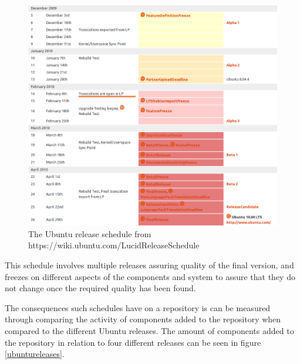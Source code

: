\begin{figure}[htp]
\begin{center}
  \includegraphics[width=\textwidth]{ubuntusimulationpics/ubunturelease}
  \caption[labelInTOC]{The Ubuntu release schedule from https://wiki.ubuntu.com/LucidReleaseSchedule}
  \label{ubuntuSchedule}
\end{center}
\end{figure}

This schedule involves multiple releases assuring quality of the final version, 
and freezes on different aspects of the components and system to assure that they do not change once the required quality has been found.


The consequences such schedules have on a repository is can be measured through comparing the activity of components added to the repository when compared to the different Ubuntu releases.
The amount of components added to the repository in relation to four different releases can be seen in figure \ref{ubuntureleases}.

